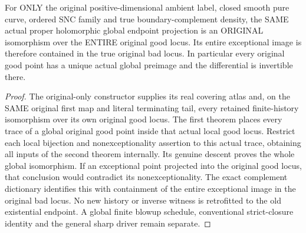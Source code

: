 \begin{theorem}
\label{hir:sharp-actual-original-global-good-isomorphism}
\leanok
For ONLY the original positive-dimensional ambient label, closed smooth
pure curve, ordered SNC family and true boundary-complement density,
the SAME actual proper holomorphic global endpoint projection is an
ORIGINAL isomorphism over the ENTIRE original good locus. Its entire
exceptional image is therefore contained in the true original bad
locus. In particular every original good point has a unique actual
global preimage and the differential is invertible there.
\end{theorem}
\begin{proof}
The original-only constructor supplies its real covering atlas and,
on the SAME original first map and literal terminating tail, every
retained finite-history isomorphism over its own original good locus.
The first theorem places every trace of a global original good point
inside that actual local good locus. Restrict each local bijection
and nonexceptionality assertion to this actual trace, obtaining all
inputs of the second theorem internally. Its genuine descent proves
the whole global isomorphism. If an exceptional point projected into
the original good locus, that conclusion would contradict its
nonexceptionality. The exact complement dictionary identifies this
with containment of the entire exceptional image in the original bad
locus. No new history or inverse witness is retrofitted to the old
existential endpoint. A global finite blowup schedule, conventional
strict-closure identity and the general sharp driver remain separate.
\end{proof}
